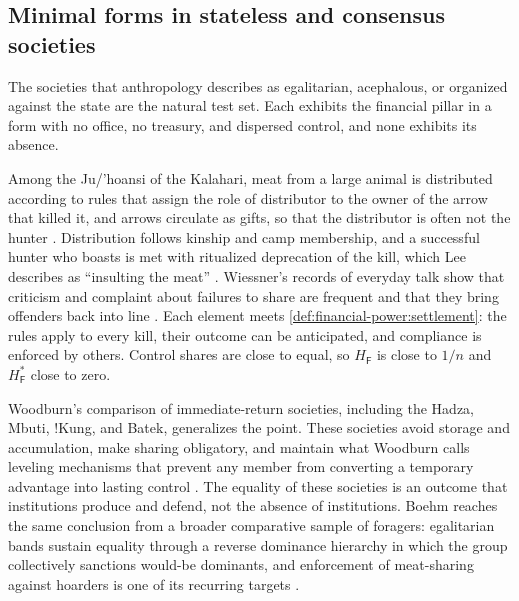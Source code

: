 \documentclass[11pt,letterpaper]{article}
\theoremstyle{definition}
\theoremstyle{remark}
\newcommand{\pF}{\mathsf{F}}
\begin{document}
\subsection{Minimal forms in stateless and consensus societies}

The societies that anthropology describes as egalitarian, acephalous, or organized against the state are the natural test set. Each exhibits the financial pillar in a form with no office, no treasury, and dispersed control, and none exhibits its absence.

Among the Ju/'hoansi of the Kalahari, meat from a large animal is distributed according to rules that assign the role of distributor to the owner of the arrow that killed it, and arrows circulate as gifts, so that the distributor is often not the hunter \citep{marshall1976,lee1979}. Distribution follows kinship and camp membership, and a successful hunter who boasts is met with ritualized deprecation of the kill, which Lee describes as ``insulting the meat'' \citep{lee2013}. Wiessner's records of everyday talk show that criticism and complaint about failures to share are frequent and that they bring offenders back into line \citep{wiessner2005}. Each element meets \cref{def:financial-power:settlement}: the rules apply to every kill, their outcome can be anticipated, and compliance is enforced by others. Control shares are close to equal, so $H_{\pF}$ is close to $1/n$ and $H^{*}_{\pF}$ close to zero.

Woodburn's comparison of immediate-return societies, including the Hadza, Mbuti, !Kung, and Batek, generalizes the point. These societies avoid storage and accumulation, make sharing obligatory, and maintain what Woodburn calls leveling mechanisms that prevent any member from converting a temporary advantage into lasting control \citep{woodburn1982}. The equality of these societies is an outcome that institutions produce and defend, not the absence of institutions. Boehm reaches the same conclusion from a broader comparative sample of foragers: egalitarian bands sustain equality through a reverse dominance hierarchy in which the group collectively sanctions would-be dominants, and enforcement of meat-sharing against hoarders is one of its recurring targets \citep{boehm1999}.
\end{document}
